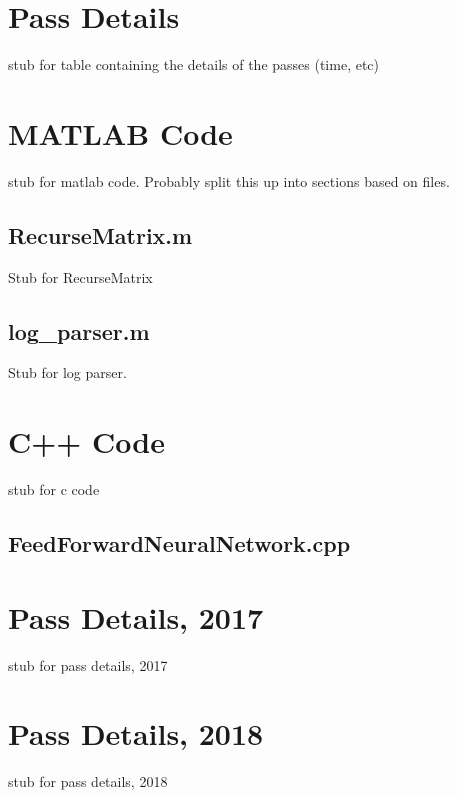 
\begin{appendices}
\chapter{Pass Details}\label{app:pass_details}
\par stub for table containing the details of the passes (time, etc)
\chapter{MATLAB Code}\label{app:MatlabCode}
\par stub for matlab code. Probably split this up into sections based on files.
\section{RecurseMatrix.m}\label{app:MatlabCode:recurseMatrix}
\par Stub for RecurseMatrix

\section{log\_parser.m}\label{app:MatlabCode:parser}
\par Stub for log parser.

\chapter{C++ Code} \label{app:CppCode}
\par stub for c code
\section{FeedForwardNeuralNetwork.cpp} \label{app:CppCode:ffnn}

\chapter{Pass Details, 2017}
\par stub for pass details, 2017
\chapter{Pass Details, 2018}
\par stub for pass details, 2018
\end{appendices}